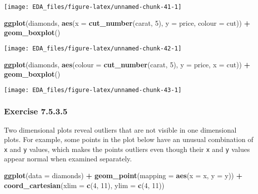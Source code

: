 \documentclass[]{book}
\newenvironment{Shaded}{\begin{snugshade}}{\end{snugshade}}
\newcommand{\DataTypeTok}[1]{\textcolor[rgb]{0.13,0.29,0.53}{#1}}
\newcommand{\DecValTok}[1]{\textcolor[rgb]{0.00,0.00,0.81}{#1}}
\newcommand{\KeywordTok}[1]{\textcolor[rgb]{0.13,0.29,0.53}{\textbf{#1}}}
\newcommand{\NormalTok}[1]{#1}
\newcommand{\OperatorTok}[1]{\textcolor[rgb]{0.81,0.36,0.00}{\textbf{#1}}}
\newcommand{\StringTok}[1]{\textcolor[rgb]{0.31,0.60,0.02}{#1}}
\theoremstyle{plain}
\theoremstyle{remark}
\theoremstyle{definition}
\theoremstyle{definition}
\theoremstyle{definition}
\theoremstyle{remark}
\begin{document}
\begin{center}\texttt{[image: EDA\_files/figure-latex/unnamed-chunk-41-1]} \end{center}

\begin{Shaded}
\begin{Highlighting}[]
\KeywordTok{ggplot}\NormalTok{(diamonds, }\KeywordTok{aes}\NormalTok{(}\DataTypeTok{x =} \KeywordTok{cut_number}\NormalTok{(carat, }\DecValTok{5}\NormalTok{), }\DataTypeTok{y =}\NormalTok{ price, }\DataTypeTok{colour =}\NormalTok{ cut)) }\OperatorTok{+}
\StringTok{  }\KeywordTok{geom_boxplot}\NormalTok{()}
\end{Highlighting}
\end{Shaded}

\begin{center}\texttt{[image: EDA\_files/figure-latex/unnamed-chunk-42-1]} \end{center}

\begin{Shaded}
\begin{Highlighting}[]
\KeywordTok{ggplot}\NormalTok{(diamonds, }\KeywordTok{aes}\NormalTok{(}\DataTypeTok{colour =} \KeywordTok{cut_number}\NormalTok{(carat, }\DecValTok{5}\NormalTok{), }\DataTypeTok{y =}\NormalTok{ price, }\DataTypeTok{x =}\NormalTok{ cut)) }\OperatorTok{+}
\StringTok{  }\KeywordTok{geom_boxplot}\NormalTok{()}
\end{Highlighting}
\end{Shaded}

\begin{center}\texttt{[image: EDA\_files/figure-latex/unnamed-chunk-43-1]} \end{center}

\hypertarget{exercise-7.5.3.5}{%
\subsubsection*{\texorpdfstring{Exercise
{7.5.3.5}}{Exercise 7.5.3.5}}\label{exercise-7.5.3.5}}

Two dimensional plots reveal outliers that are not visible in one
dimensional plots. For example, some points in the plot below have an
unusual combination of \texttt{x} and \texttt{y} values, which makes the
points outliers even though their \texttt{x} and \texttt{y} values
appear normal when examined separately.

\begin{Shaded}
\begin{Highlighting}[]
\KeywordTok{ggplot}\NormalTok{(}\DataTypeTok{data =}\NormalTok{ diamonds) }\OperatorTok{+}
\StringTok{  }\KeywordTok{geom_point}\NormalTok{(}\DataTypeTok{mapping =} \KeywordTok{aes}\NormalTok{(}\DataTypeTok{x =}\NormalTok{ x, }\DataTypeTok{y =}\NormalTok{ y)) }\OperatorTok{+}
\StringTok{  }\KeywordTok{coord_cartesian}\NormalTok{(}\DataTypeTok{xlim =} \KeywordTok{c}\NormalTok{(}\DecValTok{4}\NormalTok{, }\DecValTok{11}\NormalTok{), }\DataTypeTok{ylim =} \KeywordTok{c}\NormalTok{(}\DecValTok{4}\NormalTok{, }\DecValTok{11}\NormalTok{))}
\end{Highlighting}
\end{Shaded}
\end{document}
